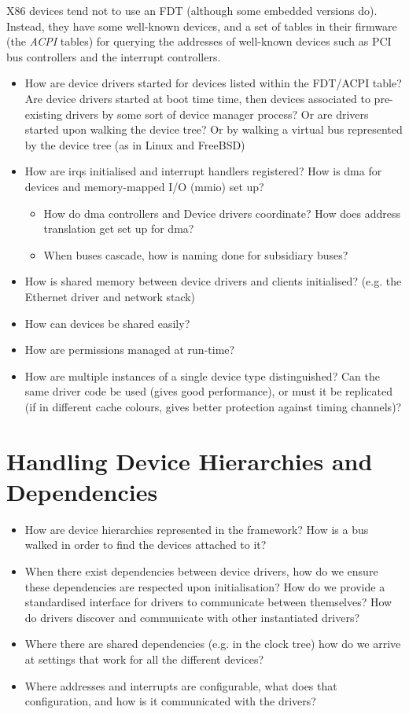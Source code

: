 \documentclass[a4paper,12pt]{report}
\begin{document}
X86 devices tend not to use an FDT (although some embedded versions
do).  Instead, they have some well-known devices, and a set of tables
in their firmware (the \emph{ACPI} tables) for querying the addresses of
well-known devices such as PCI bus controllers and the interrupt controllers.

\begin{itemize}
\item How are device drivers started for devices listed within the
  FDT/ACPI table? Are device drivers started at boot time time, then
  devices associated to pre-existing drivers by some sort of device
  manager process? Or are drivers started upon walking the device
  tree? Or by walking a virtual bus represented by the device tree (as
  in Linux and FreeBSD)
\item How are \glspl{irq} initialised and interrupt handlers registered? How
  is \gls{dma} for devices and memory-mapped I/O (\gls{mmio}) set up?
  \begin{itemize}
  \item How do \gls{dma} controllers and Device drivers coordinate?  How does
    address translation get set up for \gls{dma}?
  \item When buses cascade, how is naming done for subsidiary buses?
  \end{itemize}

\item How is shared memory between device drivers and clients
  initialised? (e.g. the Ethernet driver and network stack)
\item How can devices be shared easily?
\item How are permissions managed at run-time?
\item How are multiple instances of a single device type
  distinguished?  Can the same driver code be used (gives good
  performance), or must it be replicated (if in different cache
  colours, gives better protection against timing channels)?
\end{itemize}

\section{Handling Device Hierarchies and Dependencies}

\begin{itemize}
\item How are device hierarchies represented in the framework?  How is
  a bus walked in order to find the devices attached to it?
\item When there exist dependencies between device drivers, how do we
  ensure these dependencies are respected upon initialisation? How do
  we provide a standardised interface for drivers to communicate
  between themselves?  How do drivers discover and communicate with
  other instantiated drivers?
\item Where there are shared dependencies (e.g. in the clock tree)
  how do we arrive at settings that work for all the different
  devices?
\item Where addresses and interrupts are configurable, what does that
  configuration, and how is it communicated with the drivers?
\end{itemize}
\end{document}
